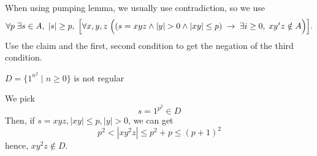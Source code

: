 \begin{lemma}
    When using pumping lemma, we usually use contradiction, so we use
    \[
        \forall p\;
        \exists s \in A,\; |s| \ge p,\;
        \Bigl[
        \forall x, y, z\;
        \Bigl(
            (s = xyz \wedge |y| > 0 \wedge |xy| \le p)
            \;\rightarrow\;
            \exists i \ge 0,\; xy^i z \notin A
        \Bigr)
        \Bigr].
    \]
    Use the claim and the first, second condition to get the negation of the third condition.
\end{lemma}

\newpage

\begin{exercise}
    $D=\{1^{n^2}\mid n \geq 0\}$ is not regular
\end{exercise}
\begin{answer}
    We pick 
    \[
        s = 1^{p^2} \in D
    \]
    Then, if $s = xyz, |xy| \leq p, |y| > 0$, we can get
    \[
        p^2 < |xy^2z| \leq p^2 + p \leq (p+1)^2
    \]
    hence, $xy^2z \notin D$.
\end{answer}